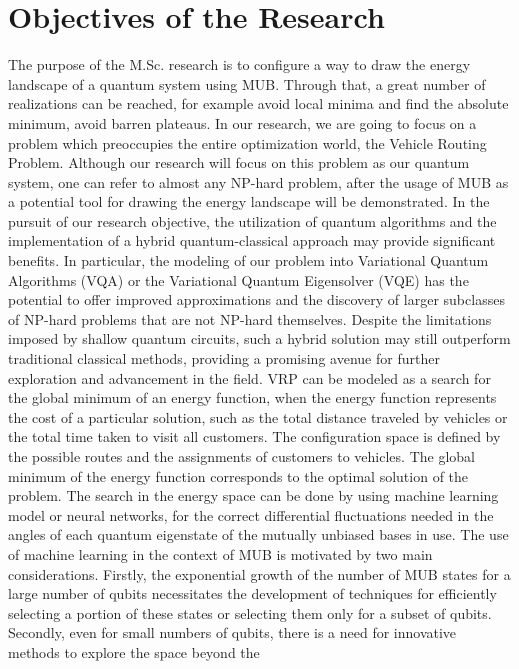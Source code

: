 \documentclass[12pt, a4paper]{article}
\begin{document}
    \section{Objectives of the Research}\label{sec:objectives-of-the-research}
    The purpose of the M.Sc. research is to configure a way to draw the energy landscape of a quantum system using MUB.
    Through that, a great number of realizations can be reached, for example avoid local minima and find the absolute minimum, avoid barren plateaus\@.
    In our research, we are going to focus on a problem which preoccupies the entire optimization world, the Vehicle Routing Problem.
    Although our research will focus on this problem as our quantum system, one can refer to almost any NP-hard problem, after the usage of MUB as
    a potential tool for drawing the energy landscape will be demonstrated.
    In the pursuit of our research objective, the utilization of quantum algorithms and the implementation of a hybrid
    quantum-classical approach may provide significant benefits.
    In particular, the modeling of our problem into
    Variational Quantum Algorithms (VQA) or the Variational Quantum Eigensolver (VQE) has the potential to offer
    improved approximations and the discovery of larger subclasses of NP-hard problems that are not NP-hard themselves.
    Despite the limitations imposed by shallow quantum circuits, such a hybrid solution may still outperform traditional
    classical methods, providing a promising avenue for further exploration and advancement in the field.
    VRP can be modeled as a search for the global minimum of an energy function, when the energy function represents
    the cost of a particular solution, such as the total distance traveled by vehicles or the total time taken to visit
    all customers.
    The configuration space is defined by the possible routes and the assignments of customers to vehicles.
    The global minimum of the energy function corresponds to the optimal solution of the problem\@.
    The search in the energy space can be done by using machine learning model or neural networks, for the correct differential
    fluctuations needed in the angles of each quantum eigenstate of the mutually unbiased bases in use.
    The use of machine learning in the context of MUB is motivated by two main considerations.
    Firstly, the exponential growth of the number of MUB states for a large number of qubits necessitates the development
    of techniques for efficiently selecting a portion of these states or selecting them only for a subset of qubits.
    Secondly, even for small numbers of qubits, there is a need for innovative methods to explore the space beyond the
\end{document}
